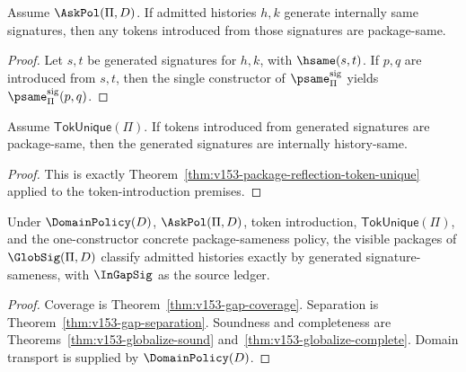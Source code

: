 \begin{theorem}
\label{thm:v153-globalize-sound}
Assume \(\AskPol(\Pi,D)\). If admitted histories \(h,k\) generate internally same signatures, then any tokens introduced from those signatures are package-same.
\end{theorem}

\begin{proof}
Let \(s,t\) be generated signatures for \(h,k\), with \(\hsame(s,t)\). If \(p,q\) are introduced from \(s,t\), then the single constructor of \(\psame_{\Pi}^{\mathrm{sig}}\) yields \(\psame_{\Pi}^{\mathrm{sig}}(p,q)\).
\end{proof}

\begin{theorem}
\label{thm:v153-globalize-complete}
Assume \(\mathsf{TokUnique}(\Pi)\). If tokens introduced from generated signatures are package-same, then the generated signatures are internally history-same.
\end{theorem}

\begin{proof}
This is exactly Theorem~\ref{thm:v153-package-reflection-token-unique} applied to the token-introduction premises.
\end{proof}

\begin{corollary}
\label{cor:v153-exact-globalize}
Under \(\DomainPolicy(D)\), \(\AskPol(\Pi,D)\), token introduction, \(\mathsf{TokUnique}(\Pi)\), and the one-constructor concrete package-sameness policy, the visible packages of \(\GlobSig(\Pi,D)\) classify admitted histories exactly by generated signature-sameness, with \(\InGapSig\) as the source ledger.
\end{corollary}

\begin{proof}
Coverage is Theorem~\ref{thm:v153-gap-coverage}. Separation is Theorem~\ref{thm:v153-gap-separation}. Soundness and completeness are Theorems~\ref{thm:v153-globalize-sound} and~\ref{thm:v153-globalize-complete}. Domain transport is supplied by \(\DomainPolicy(D)\).
\end{proof}

